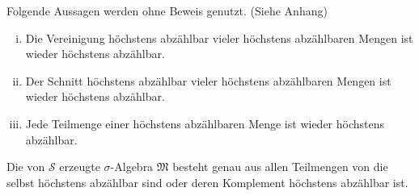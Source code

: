 \documentclass{anablatt}
\begin{document}
\begin{lemma}
Folgende Aussagen werden ohne Beweis genutzt. (Siehe Anhang)
\begin{enumerate}[(i)]
    \item Die Vereinigung höchstens abzählbar vieler höchstens abzählbaren Mengen ist wieder höchstens abzählbar.
    \item Der Schnitt höchstens abzählbar vieler höchstens abzählbaren Mengen ist wieder höchstens abzählbar.
    \item Jede Teilmenge einer höchstens abzählbaren Menge ist wieder höchstens abzählbar.
\end{enumerate}
\end{lemma}
\begin{theorem}
Die von $\mathscr{S}$ erzeugte $\sigma$-Algebra $\mathfrak{M}$ besteht genau aus allen Teilmengen von \R die selbst höchstens abzählbar sind oder deren Komplement höchstens abzählbar ist.
\end{theorem}
\def\S{\mathscr{S}}
\def\frN{\ensuremath{\mathfrak{N}} }
\def\frM{\ensuremath{\mathfrak{M}} }
\end{document}
